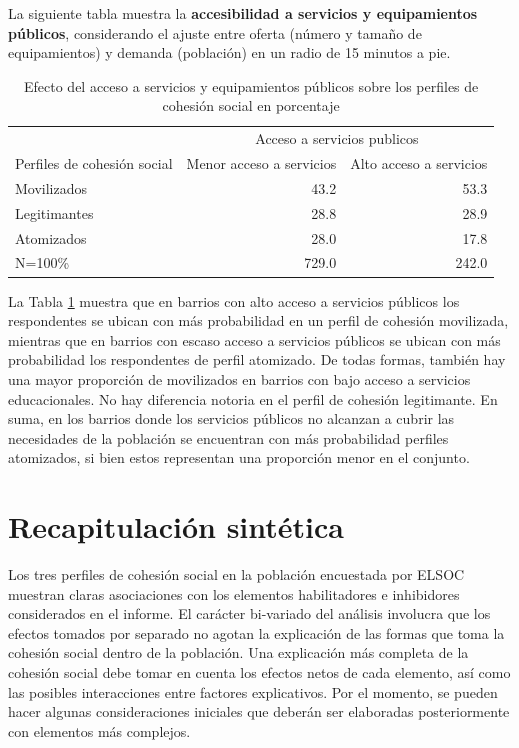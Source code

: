\documentclass[
  12pt,
]{book}
\begin{document}
La siguiente tabla muestra la \textbf{accesibilidad a servicios y equipamientos públicos}, considerando el ajuste entre oferta (número y tamaño de equipamientos) y demanda (población) en un radio de 15 minutos a pie.

\begin{table}

\caption{\label{tab:clases-accser}Efecto del acceso a servicios y equipamientos públicos sobre los perfiles de cohesión social en porcentaje}
\centering
\begin{tabular}[t]{l|r|r}
\hline
\multicolumn{1}{c|}{ } & \multicolumn{2}{c}{Acceso a servicios publicos} \\
\cline{2-3}
Perfiles de cohesión social & Menor acceso a servicios & Alto acceso a servicios\\
\hline
Movilizados & 43.2 & 53.3\\
\hline
Legitimantes & 28.8 & 28.9\\
\hline
Atomizados & 28.0 & 17.8\\
\hline
N=100\% & 729.0 & 242.0\\
\hline
\end{tabular}
\end{table}

La Tabla \ref{tab:clases-accser} muestra que en barrios con alto acceso a servicios públicos los respondentes se ubican con más probabilidad en un perfil de cohesión movilizada, mientras que en barrios con escaso acceso a servicios públicos se ubican con más probabilidad los respondentes de perfil atomizado. De todas formas, también hay una mayor proporción de movilizados en barrios con bajo acceso a servicios educacionales. No hay diferencia notoria en el perfil de cohesión legitimante. En suma, en los barrios donde los servicios públicos no alcanzan a cubrir las necesidades de la población se encuentran con más probabilidad perfiles atomizados, si bien estos representan una proporción menor en el conjunto.

\hypertarget{recapitulaciuxf3n-sintuxe9tica}{%
\section{Recapitulación sintética}\label{recapitulaciuxf3n-sintuxe9tica}}

Los tres perfiles de cohesión social en la población encuestada por ELSOC muestran claras asociaciones con los elementos habilitadores e inhibidores considerados en el informe. El carácter bi-variado del análisis involucra que los efectos tomados por separado no agotan la explicación de las formas que toma la cohesión social dentro de la población. Una explicación más completa de la cohesión social debe tomar en cuenta los efectos netos de cada elemento, así como las posibles interacciones entre factores explicativos. Por el momento, se pueden hacer algunas consideraciones iniciales que deberán ser elaboradas posteriormente con elementos más complejos.
\end{document}
